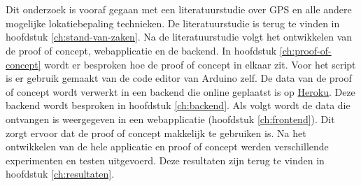 
\chapter{}
\label{ch:methodologie}

Dit onderzoek is vooraf gegaan met een literatuurstudie over GPS en alle andere mogelijke lokatiebepaling technieken. De literatuurstudie is terug te vinden in hoofdstuk \ref{ch:stand-van-zaken}.
\newline
\newline
Na de literatuurstudie volgt het ontwikkelen van de proof of concept, webapplicatie en de backend. In hoofdstuk \ref{ch:proof-of-concept} wordt er besproken hoe de proof of concept in elkaar zit. Voor het script is er gebruik gemaakt van de code editor van Arduino zelf. 
\newline
\newline
De data van de proof of concept wordt verwerkt in een backend die online geplaatst is op \href{www.heroku.com}{Heroku}. Deze backend wordt besproken in hoofdstuk \ref{ch:backend}.
\newline
\newline
Als volgt wordt de data die ontvangen is weergegeven in een webapplicatie (hoofdstuk \ref{ch:frontend}). Dit zorgt ervoor dat de proof of concept makkelijk te gebruiken is. 
\newline
\newline
Na het ontwikkelen van de hele applicatie en proof of concept werden verschillende experimenten en testen uitgevoerd. Deze resultaten zijn terug te vinden in hoofdstuk \ref{ch:resultaten}.


